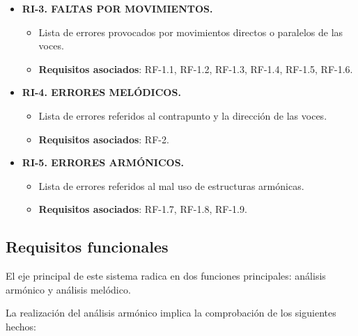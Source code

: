 \begin{itemize}

	\bigskip
	\item \textbf{RI-3. FALTAS POR MOVIMIENTOS.}
		\begin{itemize}
			\item Lista de errores provocados por movimientos directos o paralelos de las voces.
			\item \textbf{Requisitos asociados}: RF-1.1, RF-1.2, RF-1.3, RF-1.4, RF-1.5, RF-1.6.
		\end{itemize}

	\bigskip
	\item \textbf{RI-4. ERRORES MELÓDICOS.}
		\begin{itemize}
			\item Lista de errores referidos al contrapunto y la dirección de las voces.
			\item \textbf{Requisitos asociados}: RF-2.
		\end{itemize}

	\bigskip
	\item \textbf{RI-5. ERRORES ARMÓNICOS.}
		\begin{itemize}
			\item Lista de errores referidos al mal uso de estructuras armónicas.
			\item \textbf{Requisitos asociados}: RF-1.7, RF-1.8, RF-1.9.
		\end{itemize}

\end{itemize}

\subsection{Requisitos funcionales}

El eje principal de este sistema radica en dos funciones principales: análisis armónico y análisis melódico.

La realización del análisis armónico implica la comprobación de los siguientes hechos:

